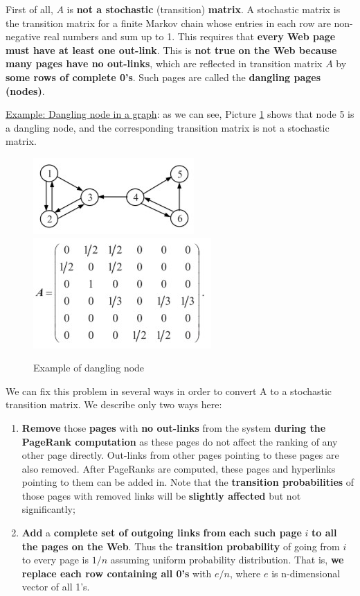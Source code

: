 First of all, $A$ is \textbf{not a stochastic} (transition) \textbf{matrix}. A stochastic matrix is the transition matrix for a finite Markov chain whose entries in each row are non-negative real numbers and sum up to 1. This requires that \textbf{every Web page must have at least one out-link}. This is \textbf{not true on the Web because many pages have no out-links}, which are reflected in transition matrix $A$ by \textbf{some rows of complete 0’s}. Such pages are called the \textbf{dangling pages (nodes)}.

\underline{Example: Dangling node in a graph}: as we can see, Picture \ref{dangling} shows that node 5 is a dangling node, and the corresponding transition matrix is not a stochastic matrix.

\begin{figure}[h!]
		\centering
		\includegraphics[scale = 1.8]{img/dangling node.jpg}
        \includegraphics[scale = 1.8]{img/dangling node matrix.jpg}
		\label{dangling}
        \caption{Example of dangling node}
\end{figure}

We can fix this problem in several ways in order to convert A to a stochastic transition matrix. We describe only two ways here:

\begin{enumerate}
    \item \textbf{Remove} those \textbf{pages} with \textbf{no out-links} from the system \textbf{during the PageRank computation} as these pages do not affect the ranking of any other page directly. Out-links from other pages pointing to these pages are also removed. After PageRanks are computed, these pages and hyperlinks pointing to them can be added in. Note that the \textbf{transition probabilities} of those pages with removed links will be \textbf{slightly affected} but not significantly;
    \item \textbf{Add} a \textbf{complete set of outgoing links} \textbf{from} \textbf{each such page} $i$ \textbf{to all the pages on the Web}. Thus the \textbf{transition probability} of going from $i$ to every page is $1/n$ assuming uniform probability distribution. That is, \textbf{we replace each row containing all 0’s} with $e/n$, where $e$ is n-dimensional vector of all 1’s.
\end{enumerate}

